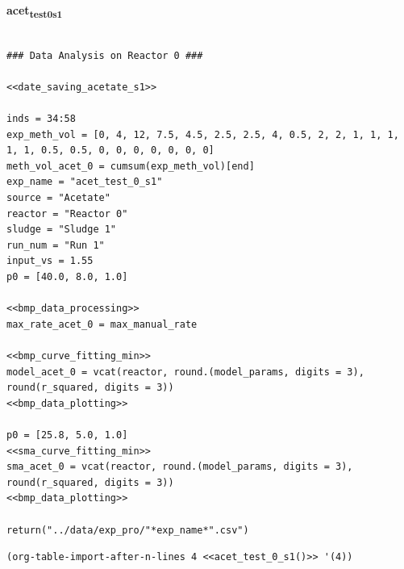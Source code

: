 \documentclass[11pt]{article}
\begin{document}
\textbf{acet\textsubscript{test}\textsubscript{0}\textsubscript{s1}}
\begin{verbatim}

### Data Analysis on Reactor 0 ###

<<date_saving_acetate_s1>>

inds = 34:58
exp_meth_vol = [0, 4, 12, 7.5, 4.5, 2.5, 2.5, 4, 0.5, 2, 2, 1, 1, 1, 1, 1, 0.5, 0.5, 0, 0, 0, 0, 0, 0, 0]
meth_vol_acet_0 = cumsum(exp_meth_vol)[end]
exp_name = "acet_test_0_s1"
source = "Acetate"
reactor = "Reactor 0"
sludge = "Sludge 1"
run_num = "Run 1"
input_vs = 1.55
p0 = [40.0, 8.0, 1.0]

<<bmp_data_processing>>
max_rate_acet_0 = max_manual_rate

<<bmp_curve_fitting_min>>
model_acet_0 = vcat(reactor, round.(model_params, digits = 3), round(r_squared, digits = 3))
<<bmp_data_plotting>>

p0 = [25.8, 5.0, 1.0]    
<<sma_curve_fitting_min>>
sma_acet_0 = vcat(reactor, round.(model_params, digits = 3), round(r_squared, digits = 3))
<<bmp_data_plotting>>

return("../data/exp_pro/"*exp_name*".csv")
\end{verbatim}

\begin{verbatim}
(org-table-import-after-n-lines 4 <<acet_test_0_s1()>> '(4))
\end{verbatim}
\end{document}
